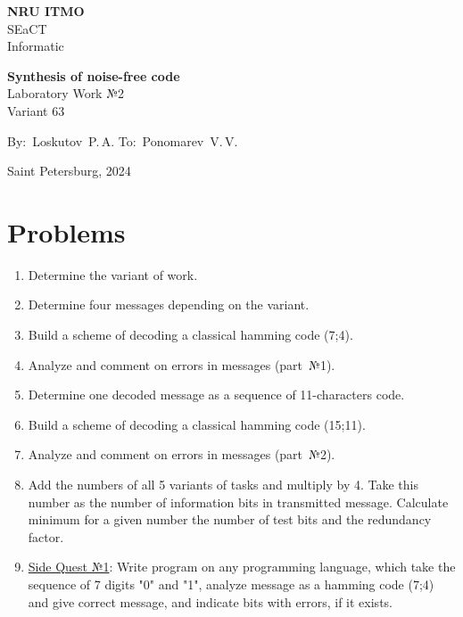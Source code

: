 \documentclass[12pt]{article}
\begin{document}
	\begin{center}
		\thispagestyle{empty}
		\LARGE
		\textbf{NRU ITMO}\\
		SEaCT\\
		Informatic
		
		\vspace{7cm}
		
		\huge
		
		\textbf{Synthesis of noise-free code}\\
		Laboratory Work №2\\
		\vspace{1cm}
		\Large
		Variant 63 
		
		\LARGE
		\vspace{5cm}
		\vbox{
			\hfill
			\vbox{
				\hbox{By: Loskutov P.\,A.}
				\hbox{To: Ponomarev V.\,V.}
			}
		} 
		
		\vspace{2.5cm}
		Saint Petersburg, 2024
		\newpage
		\tableofcontents
	\end{center}
	\newpage
	\section{\LARGE Problems}
	\Large
	\begin{enumerate}
		\item Determine the variant of work.
		\item Determine four messages depending on the variant.
		\item Build a scheme of decoding a classical hamming code (7;4). 
		\item Analyze and comment on errors in messages (part~№1).
		\item Determine one decoded message as a sequence of 11-characters code.
		\item Build a scheme of decoding a classical hamming code (15;11). 
		\item Analyze and comment on errors in messages (part~№2).
		\item Add the numbers of all 5 variants of tasks and multiply by 4. Take this number as the number of information bits in transmitted message. Calculate minimum for a given number the number of test bits and the redundancy factor.
		\item \underline{Side Quest №1}: Write program on any programming language, which take the sequence of 7 digits "0" and "1", analyze message as a hamming code (7;4) and give correct message, and indicate bits with errors, if it exists.
	\end{enumerate}
	\newpage
\end{document}
